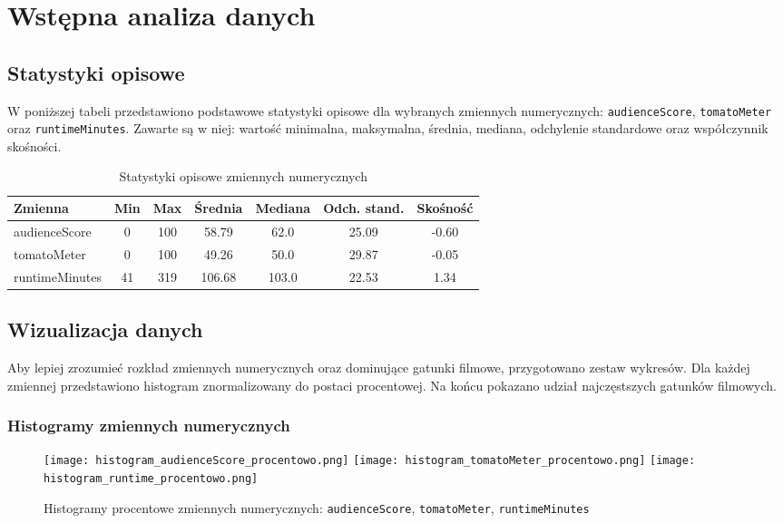 \documentclass[a4paper,12pt,titlepage]{article}
\begin{document}
\section{Wstępna analiza danych}

\subsection{Statystyki opisowe}

W poniższej tabeli przedstawiono podstawowe statystyki opisowe dla wybranych zmiennych numerycznych: \texttt{audienceScore}, \texttt{tomatoMeter} oraz \texttt{runtimeMinutes}. Zawarte są w niej: wartość minimalna, maksymalna, średnia, mediana, odchylenie standardowe oraz współczynnik skośności.

\begin{table}[H]
\centering
\caption{Statystyki opisowe zmiennych numerycznych}
\begin{tabular}{lcccccc}
\toprule
\textbf{Zmienna} & \textbf{Min} & \textbf{Max} & \textbf{Średnia} & \textbf{Mediana} & \textbf{Odch. stand.} & \textbf{Skośność} \\
\midrule
audienceScore & 0 & 100 & 58.79 & 62.0 & 25.09 & -0.60 \\
tomatoMeter & 0 & 100 & 49.26 & 50.0 & 29.87 & -0.05 \\
runtimeMinutes & 41 & 319 & 106.68 & 103.0 & 22.53 & 1.34 \\
\bottomrule
\end{tabular}
\label{tab:stat_desc}
\end{table}

\subsection{Wizualizacja danych}

Aby lepiej zrozumieć rozkład zmiennych numerycznych oraz dominujące gatunki filmowe, przygotowano zestaw wykresów. Dla każdej zmiennej przedstawiono histogram znormalizowany do postaci procentowej. Na końcu pokazano udział najczęstszych gatunków filmowych.

\subsubsection*{Histogramy zmiennych numerycznych}

\begin{figure}[H]
    \centering
    \texttt{[image: histogram\_audienceScore\_procentowo.png]}
    \texttt{[image: histogram\_tomatoMeter\_procentowo.png]}
    \texttt{[image: histogram\_runtime\_procentowo.png]}
    \caption{Histogramy procentowe zmiennych numerycznych: \texttt{audienceScore}, \texttt{tomatoMeter}, \texttt{runtimeMinutes}}
    \label{fig:histograms_numeric}
\end{figure}
\end{document}
